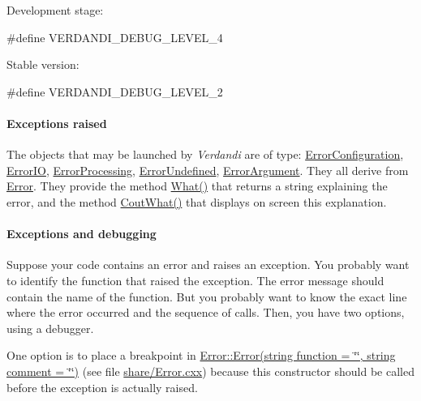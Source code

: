 \documentclass{tufte-book}
\begin{document}
\-Development stage\-:
\begin{frame_cpp}
#define VERDANDI_DEBUG_LEVEL_4
\end{frame_cpp}


\-Stable version\-:
\begin{frame_cpp}
#define VERDANDI_DEBUG_LEVEL_2
\end{frame_cpp}

 \hypertarget{debugging_exceptions_raised}{}\paragraph{\-Exceptions raised}\label{debugging_exceptions_raised}

\-The objects that may be launched by \-\emph{Verdandi} are of type\-: {\ttfamily  \hyperlink{class_verdandi_1_1_error_configuration}{\-Error\-Configuration}}, {\ttfamily  \hyperlink{class_verdandi_1_1_error_i_o}{\-Error\-I\-O}}, {\ttfamily  \hyperlink{class_verdandi_1_1_error_processing}{\-Error\-Processing}}, {\ttfamily  \hyperlink{class_verdandi_1_1_error_undefined}{\-Error\-Undefined}}, {\ttfamily  \hyperlink{class_verdandi_1_1_error_argument}{\-Error\-Argument}}. \-They all derive from {\ttfamily  \hyperlink{class_verdandi_1_1_error}{\-Error}}. \-They provide the method {\ttfamily  \hyperlink{class_verdandi_1_1_error_aa47cac6050d224b364a6105787ff46a2}{\-What()}} that returns a string explaining the error, and the method {\ttfamily  \hyperlink{class_verdandi_1_1_error_a8febb68b76e72696a384690ec9bfeb17}{\-Cout\-What()}} that displays on screen this explanation.

\hypertarget{debugging_exceptions_and_debugging}{}\paragraph{\-Exceptions and debugging}\label{debugging_exceptions_and_debugging}

\-Suppose your code contains an error and raises an exception. \-You probably want to identify the function that raised the exception. \-The error message should contain the name of the function. \-But you probably want to know the exact line where the error occurred and the sequence of calls. \-Then, you have two options, using a debugger.

\-One option is to place a breakpoint in {\ttfamily  \hyperlink{class_verdandi_1_1_error_aa424e0d7f1462881ca27f07ed9fa32a1}{\-Error\-::\-Error(string function = \char`\"{}\char`\"{}, string comment = \char`\"{}\char`\"{})}} (see file {\ttfamily \hyperlink{_error_8cxx_source}{share/\-Error.\-cxx}}) because this constructor should be called before the exception is actually raised.
\end{document}
